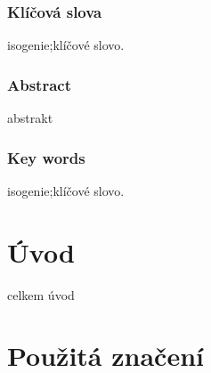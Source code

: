 \documentclass [12pt]{report}
\begin{document}
\subsection*{Klíčová slova}
isogenie;klíčové slovo.


\vspace*{4cm}

\subsection*{Abstract}
abstrakt

\subsection*{Key words}
isogenie;klíčové slovo.






\tableofcontents
\thispagestyle{empty}

\chapter*{Úvod}

celkem úvod




\chapter*{Použitá značení}
\end{document}
